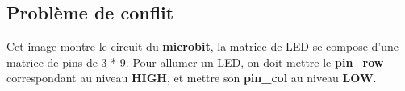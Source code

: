 \documentclass[14px]{article}
\begin{document}
\clearpage

\subsection{Problème de conflit}
\begin{figure}[htbp]
\end{figure}
Cet image montre le circuit du \textbf{microbit}, la matrice de LED se compose d'une matrice de pins de 3 * 9. Pour allumer un LED, on doit mettre le \textbf{pin\_row} correspondant au niveau \textbf{HIGH}, et mettre son \textbf{pin\_col} au niveau \textbf{LOW}.
\end{document}
